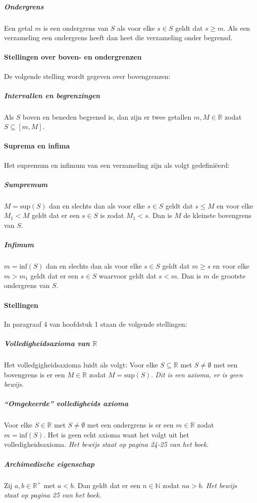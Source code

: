 \subparagraph{Ondergrens} Een getal $m$ is een ondergrens van $S$ als voor elke $s \in S$ geldt dat $s \geq m$. Als een verzameling een ondergrens heeft dan heet die verzameling onder begrensd.

\paragraph{Stellingen over boven- en ondergrenzen} De volgende stelling wordt gegeven over bovengrenzen:

\subparagraph{Intervallen en begrenzingen} Als $S$ boven en beneden begrensd is, dan zijn er twee getallen $m,M\in\mathbb{R}$ zodat $S\subseteq [m,M]$.

\paragraph{Suprema en infima} Het supremum en infimum van een verzameling zijn als volgt gedefiniëerd:

\subparagraph{Sumpremum} $M=\text{sup}(S)$ dan en slechts dan als voor elke $s \in S$ geldt dat $s \leq M$ en voor elke $M_{1}<M$ geldt dat er een $s \in S$ is zodat $M_{1}<s$. Dan is $M$ de kleinste bovengrens van $S$.

\subparagraph{Infimum} $m=\text{inf}(S)$ dan en slechts dan als voor elke $s \in S$ geldt dat $m \geq s$ en voor elke $m>m_{1}$ geldt dat er een $s \in S$ waarvoor geldt dat $s<m$. Dan is $m$ de grootste ondergrens van $S$.

\paragraph{Stellingen} In paragraaf 4 van hoofdstuk 1 staan de volgende stellingen:

\subparagraph{Volledigheidsaxioma van $\mathbb{R}$} Het volledgigheidsaxioma luidt als volgt: Voor elke $S\subseteq\mathbb{R}$ met $S\neq\emptyset$ met een bovengrens is er een $M\in\mathbb{R}$ zodat $M=\text{sup}(S)$. \textit{Dit is een axioma, er is geen bewijs.}

\subparagraph{``Omgekeerde'' volledigheids \bq axioma\eq} Voor elke $S\in\mathbb{R}$ met $S\neq\emptyset$ met een ondergrens is er een $m\in\mathbb{R}$ zodat $m=\text{inf}(S)$. Het is geen echt axioma want het volgt uit het volledigheidsaxioma. \textit{Het bewijs staat op pagina 24-25 van het boek.}

\subparagraph{Archimedische eigenschap} Zij $a,b\in\mathbb{R}^{+}$ met $a<b$. Dan geldt dat er een $n\in\mathbb{N}$ zodat $na>b$. \textit{Het bewijs staat op pagina 25 van het boek.}

